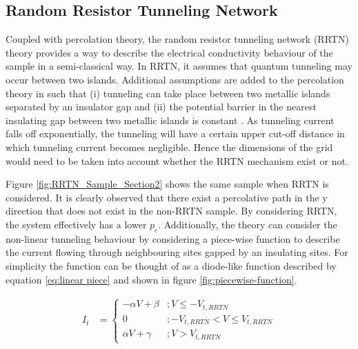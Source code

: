 \documentclass[11pt,a4paper]{report}
\begin{document}
\subsection{Random Resistor Tunneling Network} \label{section:RRTN}

Coupled with percolation theory, the random resistor tunneling network (RRTN) theory provides a way to describe the electrical conductivity behaviour of the sample in a semi-classical way. In RRTN, it assumes that quantum tunneling may occur between two islands. Additional assumptions are added to the percolation theory in such that (i) tunneling can take place between two metallic islands separated by an insulator gap and (ii) the potential barrier in the nearest insulating gap between two metallic islands is constant \cite{Stauffer_RRTN_2009}. As tunneling current falls off exponentially, the tunneling will have a certain upper cut-off distance in which tunneling current becomes negligible. Hence the dimensions of the grid would need to be taken into account whether the RRTN mechanism exist or not.

Figure \ref{fig:RRTN_Sample_Section2} shows the same sample when RRTN is considered. It is clearly observed that there exist a percolative path in the y direction that does not exist in the non-RRTN sample. By considering RRTN, the system effectively has a lower $p_c$. Additionally, the theory can consider the non-linear tunneling behaviour by considering a piece-wise function to describe the current flowing through neighbouring sites gapped by an insulating sites. For simplicity the function can be thought of as a diode-like function described by equation \ref{eq:linear piece} and shown in figure \ref{fig:piecewise-function}.

\begin{align}
     I_{t} &=
  \begin{cases}
        -\alpha V + \beta & ; V \leq -V_{t,RRTN}\\
        0 & ; -V_{t,RRTN} < V \leq V_{t,RRTN} \\
        \alpha V + \gamma & ; V > V_{t,RRTN}
  \end{cases}
  \label{eq:linear piece}
\end{align}
\end{document}
